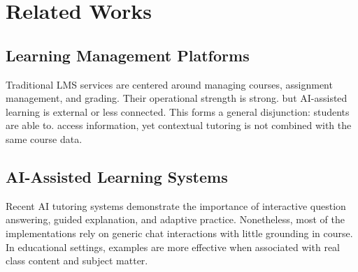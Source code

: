 \chapter{Related Works}

\section{Learning Management Platforms}
Traditional LMS services are centered around managing courses, assignment management, and grading. Their operational strength is strong.
but AI-assisted learning is external or less connected. This forms a general disjunction: students are able to.
access information, yet contextual tutoring is not combined with the same course data.

\section{AI-Assisted Learning Systems}
Recent AI tutoring systems demonstrate the importance of interactive question answering, guided explanation, and adaptive practice.
Nonetheless, most of the implementations rely on generic chat interactions with little grounding in course. In educational settings,
examples are more effective when associated with real class content and subject matter.

